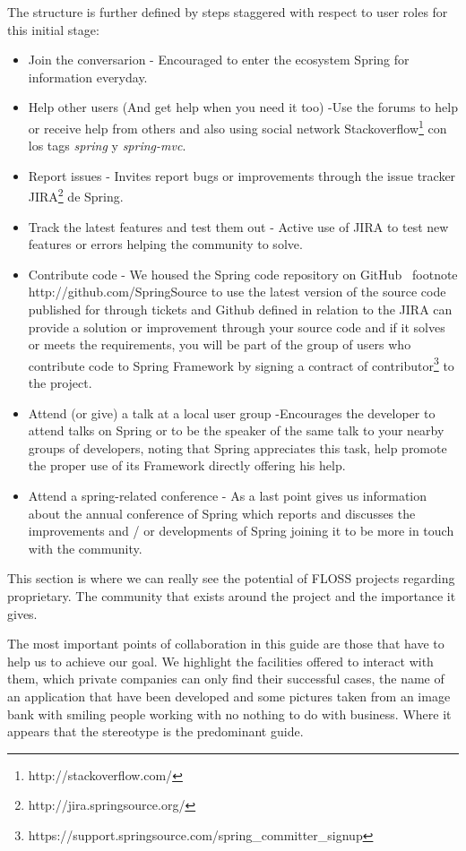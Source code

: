 \documentclass[11pt]{scrartcl}
\begin{document}
\par The structure is further defined by steps staggered with respect to user roles for this initial stage:

\begin{itemize}
    \item Join the conversarion - Encouraged to enter the ecosystem Spring for information everyday.
    \item Help other users (And get help when you need it too) -Use the forums to help or receive help from others and also using social network Stackoverflow\footnote{http://stackoverflow.com/} con los tags \emph{spring} y \emph{spring-mvc}.
    \item Report issues - Invites report bugs or improvements through the issue tracker JIRA\footnote{http://jira.springsource.org/} de Spring.
    \item Track the latest features and test them out - Active use of JIRA to test new features or errors helping the community to solve.
    \item Contribute code - We housed the Spring code repository on GitHub \ footnote {http://github.com/SpringSource} to use the latest version of the source code published for through tickets and Github defined in relation to the JIRA can provide a solution or improvement through your source code and if it solves or meets the requirements, you will be part of the group of users who contribute code to Spring Framework by signing a contract of contributor\footnote{https://support.springsource.com/spring\_committer\_signup} to the project.
    \item Attend (or give) a talk at a local user group -Encourages the developer to attend talks on Spring or to be the speaker of the same talk to your nearby groups of developers, noting that Spring appreciates this task, help promote the proper use of its Framework directly offering his help.
    \item Attend a spring-related conference - As a last point gives us information about the annual conference of Spring which reports and discusses the improvements and / or developments of Spring joining it to be more in touch with the community.
\end{itemize}

\par This section is where we can really see the potential of FLOSS projects regarding proprietary. The community that exists around the project and the importance it gives.

\par The most important points of collaboration in this guide are those that have to help us to achieve our goal. We highlight the facilities offered to interact with them, which private companies can only find their successful cases, the name of an application that have been developed and some pictures taken from an image bank with smiling people working with no nothing to do with business. Where it appears that the stereotype is the predominant guide.
\end{document}
